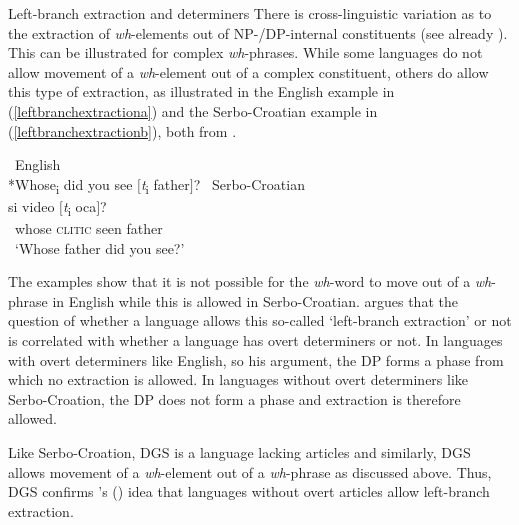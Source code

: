 \begin{digression}{Left-branch extraction and determiners}{}
\noindent There is cross-linguistic variation as to the extraction of \textit{wh}-elements out of NP-/DP-internal constituents (see already \citealt{ross1967constraints}). This can be illustrated for complex \textit{wh}-phrases. While some languages do not allow movement of a \textit{wh}-element out of a complex constituent, others do allow this type of extraction, as illustrated in the English example in (\ref{leftbranchextractiona}) and the Serbo-Croatian example in (\ref{leftbranchextractionb}), both from \citet[14--15]{bovskovic2005left}.



\begin{exe}
\ex\label{leftbranchextraction}\begin{xlist}
\ex \textcolor{white}{*}English \\ *Whose\textsubscript{i} did you see $[$\textit{t}\textsubscript{i} father$]$? \label{leftbranchextractiona}
\ex \textcolor{white}{*}Serbo-Croatian \\  {si} {video} {$[$\textit{t}\textsubscript{i}} {oca$]$?}  \\
{\textcolor{white}{*}whose} {\textsc{clitic}} {seen} {} {father} \\
\trans \textcolor{white}{*}`Whose father did you see?' \label{leftbranchextractionb}
\end{xlist}
\end{exe}

\noindent The examples show that it is not possible for the \textit{wh}-word to move out of a \textit{wh}-phrase in English while this is allowed in Serbo-Croatian. \citet{bovskovic2005left, bovskovic2005locality} argues that the question of whether a language allows this so-called `left-branch extraction' or not is correlated with whether a language has overt determiners or not. In languages with overt determiners like English, so his argument, the DP forms a phase from which no extraction is allowed. In languages without overt determiners like Serbo-Croation, the DP does not form a phase and extraction is therefore allowed.

Like Serbo-Croation, DGS is a language lacking articles \citep[91]{happ2014vork} and similarly, DGS allows movement of a \textit{wh}-element out of a \textit{wh}-phrase as discussed above. Thus, DGS confirms \citeauthor{bovskovic2005left}'s (\citeyear{bovskovic2005left, bovskovic2005locality}) idea that languages without overt articles allow left-branch extraction.


\end{digression}
